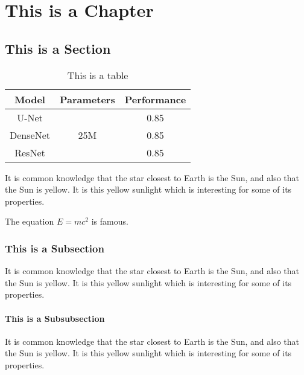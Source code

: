 
\chapter{This is a Chapter}
\begin{refsection}

\section{This is a Section}

\begin{table}[!h]
\centering
\caption{This is a table}
\label{tbl:sampleTbl1}
\begin{tabular}{ccc}
\hline
\textbf{Model} & \textbf{Parameters} & \textbf{Performance} \\ 
\hline
U-Net & \multirow{3}{*}{25M} & 0.85 \\
DenseNet &  & 0.85 \\
ResNet & & 0.85 \\ 
\hline
\end{tabular}
\end{table}

It is common knowledge that the star closest to Earth is the Sun, and also that the Sun is yellow. It is this yellow sunlight which is interesting for some of its properties.

The equation $E=mc^2$ is famous.

\subsection{This is a Subsection}

It is common knowledge that the star closest to Earth is the Sun, and also that the Sun is yellow. It is this yellow sunlight which is interesting for some of its properties.

\subsubsection{This is a Subsubsection}

It is common knowledge that the star closest to Earth is the Sun, and also that the Sun is yellow. It is this yellow sunlight which is interesting for some of its properties.






\clearpage

\printbibliography[heading=subbibintoc, title={\centering Notes}]
\end{refsection}